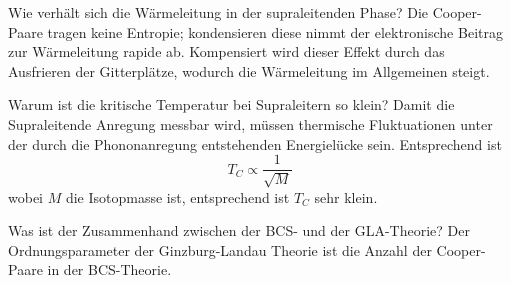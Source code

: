 \begin{fquestion}{Wie verhält sich die Wärmeleitung in der supraleitenden Phase?}
    Die Cooper-Paare tragen keine Entropie; kondensieren diese nimmt der elektronische Beitrag zur Wärmeleitung rapide ab.
    Kompensiert wird dieser Effekt durch das Ausfrieren der Gitterplätze, wodurch die Wärmeleitung im Allgemeinen steigt.
\end{fquestion}




    



\begin{fquestion}{Warum ist die kritische Temperatur bei Supraleitern so klein?}
    Damit die Supraleitende Anregung messbar wird, müssen thermische Fluktuationen unter der durch die Phononanregung entstehenden Energielücke sein. 
    Entsprechend ist 
    \[T_C \propto \frac{1}{\sqrt{M}}\]
    wobei $M$ die Isotopmasse ist, entsprechend ist $T_C$ sehr klein. 
\end{fquestion}

\begin{fquestion}{Was ist der Zusammenhand zwischen der BCS- und der GLA-Theorie?}
    Der Ordnungsparameter der Ginzburg-Landau Theorie ist die Anzahl der Cooper-Paare in der BCS-Theorie.
\end{fquestion}

